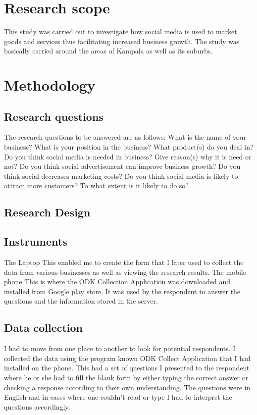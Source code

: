 \documentclass[12pt]{article}
\begin{document}
\section{Research scope}
This study was carried out to investigate how social media is used to market goods and services thus facilitating increased business growth. The study was basically carried around the areas of Kampala as well as its suburbs.
\section{Methodology}
\subsection{Research questions }
The research questions to be answered are as follows:
What is the name of your business?
What is your position in the business?
What product(s) do you deal in?
Do you think social media is needed in business?
Give reason(s) why it is need or not?
Do you think social advertisement can improve business growth?
Do you think social decreases marketing costs?
Do you think social media is likely to attract more customers?
To what extent is it likely to do so?	
\subsection{Research Design }






\subsection{Instruments}
The Laptop
This enabled me to create the form that I later used to collect the data from various businesses as well as viewing the research results.
The mobile phone
This is where the ODK Collection Application was downloaded and installed from Google play store. It was used by the respondent to answer the questions and the information stored in the server.
\subsection{Data collection }
I had to move from one place to another to look for potential respondents. I collected the data using the program known ODK Collect Application that I had installed on the phone.  This had a set of questions I presented to the respondent where he or she had to fill the blank form by either typing the correct answer or checking a response according to their own understanding. The questions were in English and in cases where one couldn’t read or type I had to interpret the questions accordingly.
\end{document}
